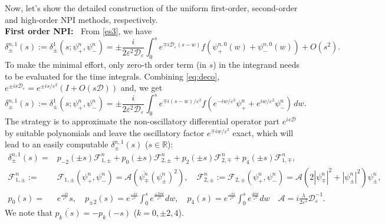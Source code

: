 \documentclass[final,leqno,showlabe]{siamltex}
\begin{document}
Now, let's show the detailed construction of the uniform first-order, second-order and high-order NPI methods, respectively.\\
{\bf{First order NPI:\    }}
From \eqref{es3}, we have
\begin{equation}\label{1stnpi}
\delta_\pm^{n,1}(s):=\delta_\pm^{1}(s;\psi_+^n,\psi_-^n)=\pm \frac{i}{2\varepsilon^2\mathcal{D}_{\varepsilon} }\int_0^s e^{\mp i \mathcal{D}_\varepsilon (s-w)} f(\psi_+^{n,0}(w)+\psi_-^{n,0}(w))+O(s^{2}).
\end{equation}
To make the minimal effort,  only zero-th order term (in $s$) in the integrand needs to be evaluated for the time integrals. Combining \eqref{eq:deco}, $e^{\pm is\mathcal{D}_\varepsilon}=e^{\pm is/\varepsilon^2} (I+O(s\mathcal{D}))$ and, we get
\begin{equation}\label{eq:delta1}
\delta_\pm^{n,1}(s):=\delta_\pm^{1}(s;\psi_+^n,\psi_-^n)=\pm \frac{i}{2\varepsilon^2\mathcal{D}_{\varepsilon} }\int_0^s e^{\mp i  (s-w)/\varepsilon^2} f(e^{-iw/\varepsilon^2}\psi_+^{n}+e^{iw/\varepsilon^2}\psi_-^{n})\,dw.
\end{equation}
The strategy is to approximate the non-oscillatory differential operator part $e^{is\mathcal{D}}$  by suitable polynomials  and leave the oscillatory factor $e^{\mp iw/\varepsilon^2}$ exact, which will lead to an easily computable $\delta_\pm^{n,1}(s)$ ($s\in\mathbb{R}$):
\begin{align}
\delta_{\pm}^{n,1}(s)=&p_{-2}(\pm s)\mathcal{F}_{1,\pm}^n+ p_0(\pm s)\mathcal{F}_{2,\pm}^n+p_{2}(\pm s)\mathcal{F}_{2,\mp}^n+p_{4}(\pm s)\mathcal{F}_{1,\mp}^n,\label{eq:npi1}\\
\mathcal{F}_{1,\pm}^n:=&\mathcal{F}_{1,\pm}(\psi_+^n,\psi_-^n)=\mathcal{A}(\overline{\psi_\mp^n}(\psi_\pm^n)^2),
\quad\mathcal{F}_{2,\pm}^n:=\mathcal{F}_{2,\pm}(\psi_+^n,\psi_-^n)=\mathcal{A}\left(2|\psi_\mp^n|^2 +|\psi_\pm^n|^2\right)\psi_\pm^n,\nonumber\\
p_{0}(s)=&e^{\frac{-is}{\varepsilon^2}}s,\quad
 p_{\pm2}(s)=e^{\frac{-is}{\varepsilon^2}}\int_{0}^{s}e^{\frac{\pm2iw}{\varepsilon^2}}dw,\quad p_{4}(s)=e^{\frac{-is}{\varepsilon^2}}\int_{0}^{s}e^{\frac{4 iw}{\varepsilon^2}}dw\quad \mathcal{A}=i\frac{\lambda}{2\varepsilon^2}\mathcal{D}_{\varepsilon}^{-1}.\nonumber
\end{align}
We note that $\overline{p_k(s)}=-p_k(-s)$ ($k=0,\pm2,4$).
\end{document}
